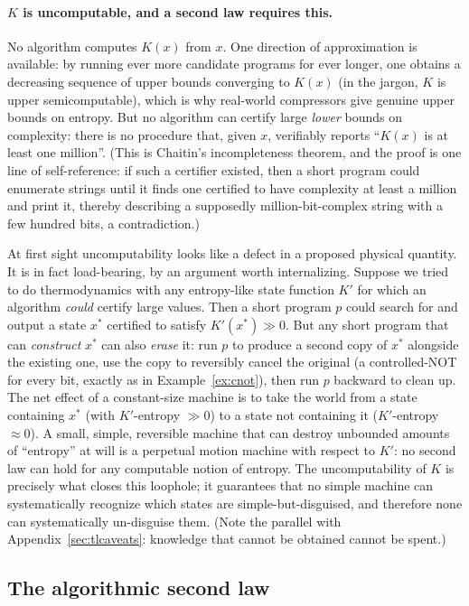 \documentclass[10pt]{article}
\theoremstyle{definition}
\theoremstyle{remark}
\begin{document}
\paragraph{$K$ is uncomputable, and a second law requires this.} No algorithm computes $K(x)$ from $x$. One direction of approximation is available: by running ever more candidate programs for ever longer, one obtains a decreasing sequence of upper bounds converging to $K(x)$ (in the jargon, $K$ is upper semicomputable), which is why real-world compressors give genuine upper bounds on entropy. But no algorithm can certify large \emph{lower} bounds on complexity: there is no procedure that, given $x$, verifiably reports ``$K(x)$ is at least one million''. (This is Chaitin's incompleteness theorem, and the proof is one line of self-reference: if such a certifier existed, then a short program could enumerate strings until it finds one certified to have complexity at least a million and print it, thereby describing a supposedly million-bit-complex string with a few hundred bits, a contradiction.)

At first sight uncomputability looks like a defect in a proposed physical quantity. It is in fact load-bearing, by an argument worth internalizing. Suppose we tried to do thermodynamics with any entropy-like state function $K'$ for which an algorithm \emph{could} certify large values. Then a short program $p$ could search for and output a state $x^*$ certified to satisfy $K'(x^*) \gg 0$. But any short program that can \emph{construct} $x^*$ can also \emph{erase} it: run $p$ to produce a second copy of $x^*$ alongside the existing one, use the copy to reversibly cancel the original (a controlled-NOT for every bit, exactly as in Example~\ref{ex:cnot}), then run $p$ backward to clean up. The net effect of a constant-size machine is to take the world from a state containing $x^*$ (with $K'$-entropy $\gg 0$) to a state not containing it ($K'$-entropy $\approx 0$). A small, simple, reversible machine that can destroy unbounded amounts of ``entropy'' at will is a perpetual motion machine with respect to $K'$: no second law can hold for any computable notion of entropy. The uncomputability of $K$ is precisely what closes this loophole; it guarantees that no simple machine can systematically recognize which states are simple-but-disguised, and therefore none can systematically un-disguise them. (Note the parallel with Appendix~\ref{sec:tlcaveats}: knowledge that cannot be obtained cannot be spent.)

\subsection{The algorithmic second law}
\label{sec:algsecondlaw}
\end{document}

